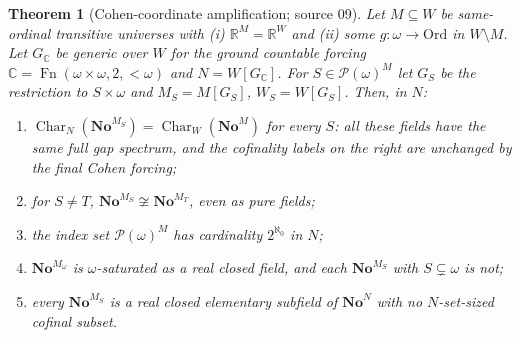 \documentclass[11pt,letterpaper]{article}
\numberwithin{equation}{section}
\newtheorem{theorem}{Theorem}[section]
\theoremstyle{definition}
\theoremstyle{remark}
\newcommand{\No}{\mathbf{No}}
\newcommand{\NoM}{\No^{M}}
\newcommand{\NoN}{\No^{N}}
\newcommand{\Ord}{\mathrm{Ord}}
\newcommand{\R}{\mathbb R}
\newcommand{\Pow}{\mathcal P}
\newcommand{\Char}{\operatorname{Char}}
\newcommand{\Fn}{\operatorname{Fn}}
\begin{document}
\begin{theorem}[Cohen-coordinate amplification; source 09]\label{univ:gs:thm:amplification}
Let $M\subseteq W$ be same-ordinal transitive universes with (i) $\R^M=\R^W$ and (ii) some
$g:\omega\to\Ord$ in $W\setminus M$. Let $G_{\mathbb C}$ be generic over $W$ for the ground
countable forcing $\mathbb C=\Fn(\omega\times\omega,2,{<}\omega)$ and $N=W[G_{\mathbb C}]$. For
$S\in\Pow(\omega)^M$ let $G_S$ be the restriction to $S\times\omega$ and
$M_S=M[G_S]$, $W_S=W[G_S]$. Then, in $N$:
\begin{enumerate}[label=\textnormal{(\alph*)}]
\item $\Char_N(\No^{M_S})=\Char_W(\NoM)$ for every $S$: all these fields have the same full gap
spectrum, and the cofinality labels on the right are unchanged by the final Cohen forcing;
\item for $S\ne T$, $\No^{M_S}\not\cong\No^{M_T}$, even as pure fields;
\item the index set $\Pow(\omega)^M$ has cardinality $2^{\aleph_0}$ in $N$;
\item $\No^{M_\omega}$ is $\omega$-saturated as a real closed field, and each $\No^{M_S}$ with
$S\subsetneq\omega$ is not;
\item every $\No^{M_S}$ is a real closed elementary subfield of $\NoN$ with no $N$-set-sized
cofinal subset.
\end{enumerate}
\end{theorem}
\end{document}
